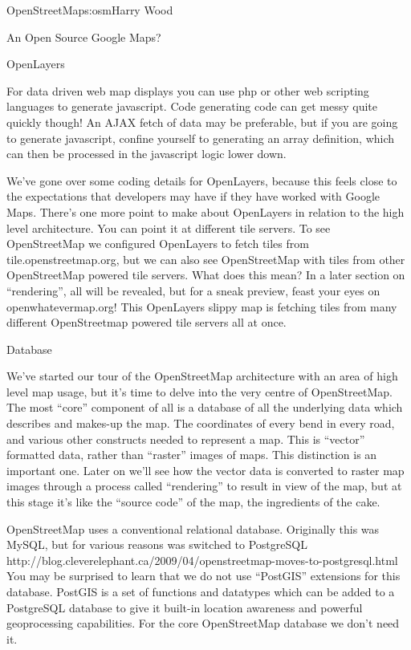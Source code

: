 \begin{aosachapter}{OpenStreetMap}{s:osm}{Harry Wood}
\begin{aosasect1}{An Open Source Google Maps?}
\begin{aosasect2}{OpenLayers}
\begin{aosaitemize}
\item For data driven web map displays you can use php or other web
  scripting languages to generate javascript. Code generating code can
  get messy quite quickly though! An AJAX fetch of data may be
  preferable, but if you are going to generate javascript, confine
  yourself to generating an array definition, which can then be
  processed in the javascript logic lower down.

\end{aosaitemize}

We've gone over some coding details for OpenLayers, because this feels
close to the expectations that developers may have if they have worked
with Google Maps. There's one more point to make about OpenLayers in
relation to the high level architecture. You can point it at different
tile servers. To see OpenStreetMap we configured OpenLayers to fetch
tiles from tile.openstreetmap.org, but we can also see OpenStreetMap
with tiles from other OpenStreetMap powered tile servers. What does
this mean? In a later section on ``rendering'', all will be revealed,
but for a sneak preview, feast your eyes on openwhatevermap.org! This
OpenLayers slippy map is fetching tiles from many different
OpenStreetmap powered tile servers all at once.

\end{aosasect2}

\end{aosasect1}

\begin{aosasect1}{Database}

We've started our tour of the OpenStreetMap architecture with an area
of high level map usage, but it's time to delve into the very centre
of OpenStreetMap. The most ``core'' component of all is a database of
all the underlying data which describes and makes-up the map. The
coordinates of every bend in every road, and various other constructs
needed to represent a map. This is ``vector'' formatted data, rather
than ``raster'' images of maps. This distinction is an important
one. Later on we'll see how the vector data is converted to raster map
images through a process called ``rendering'' to result in view of the
map, but at this stage it's like the ``source code'' of the map, the
ingredients of the cake.

OpenStreetMap uses a conventional relational database. Originally this
was MySQL, but for various reasons was switched to PostgreSQL
http://blog.cleverelephant.ca/2009/04/openstreetmap-moves-to-postgresql.html
You may be surprised to learn that we do not use ``PostGIS''
extensions for this database. PostGIS is a set of functions and
datatypes which can be added to a PostgreSQL database to give it
built-in location awareness and powerful geoprocessing
capabilities. For the core OpenStreetMap database we don't need it.


\end{aosasect1}
\end{aosachapter}
